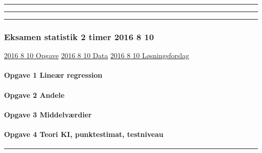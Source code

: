 \documentclass[]{book}
\let\oldparagraph\paragraph
\renewcommand{\paragraph}[1]{\oldparagraph{#1}\mbox{}}
\begin{document}
\begin{center}\rule{0.5\linewidth}{\linethickness}\end{center}

\begin{center}\rule{0.5\linewidth}{\linethickness}\end{center}

\begin{center}\rule{0.5\linewidth}{\linethickness}\end{center}

\hypertarget{eksamen-statistik-2-timer-2016-8-10}{%
\subsubsection{Eksamen statistik 2 timer 2016 8 10}\label{eksamen-statistik-2-timer-2016-8-10}}

\href{https://drive.google.com/uc?export=download\&id=0B1E7VnhxsDMlTy1NVjFBMDRLZFk}{2016 8 10 Opgave}
\href{https://drive.google.com/uc?export=download\&id=0B1E7VnhxsDMlcVdQUVFjUEp2SUE}{2016 8 10 Data}
\href{https://drive.google.com/uc?export=download\&id=0B1E7VnhxsDMlQnNjMk9XZDZKWUU}{2016 8 10 Løsningsforslag}

\hypertarget{opgave-1-liner-regression}{%
\paragraph{Opgave 1 Lineær regression}\label{opgave-1-liner-regression}}

\hypertarget{opgave-2-andele}{%
\paragraph{Opgave 2 Andele}\label{opgave-2-andele}}

\hypertarget{opgave-3-middelvrdier}{%
\paragraph{Opgave 3 Middelværdier}\label{opgave-3-middelvrdier}}

\hypertarget{opgave-4-teori-ki-punktestimat-testniveau}{%
\paragraph{Opgave 4 Teori KI, punktestimat, testniveau}\label{opgave-4-teori-ki-punktestimat-testniveau}}

\begin{center}\rule{0.5\linewidth}{\linethickness}\end{center}
\end{document}
